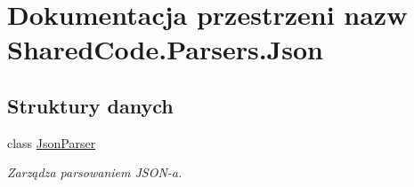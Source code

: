 \hypertarget{a00311}{}\section{Dokumentacja przestrzeni nazw Shared\+Code.\+Parsers.\+Json}
\label{a00311}
\subsection*{Struktury danych}
\begin{DoxyCompactItemize}
\item 
class \hyperlink{a00034}{Json\+Parser}
\begin{DoxyCompactList}\small\item\em Zarządza parsowaniem J\+S\+O\+N-\/a. \end{DoxyCompactList}\end{DoxyCompactItemize}
